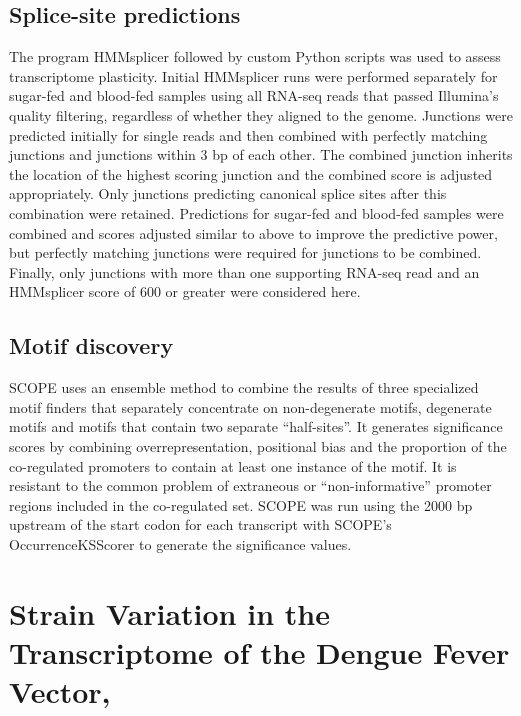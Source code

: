 \subsection{Splice-site predictions}

The program HMMsplicer \cite{Dimon2010} followed by custom Python scripts was used to assess transcriptome plasticity. Initial HMMsplicer runs were performed separately for sugar-fed and blood-fed samples using all RNA-seq reads that passed Illumina's quality filtering, regardless of whether they aligned to the genome. Junctions were predicted initially for single reads and then combined with perfectly matching junctions and junctions within 3 bp of each other. The combined junction inherits the location of the highest scoring junction and the combined score is adjusted appropriately. Only junctions predicting canonical splice sites after this combination were retained. Predictions for sugar-fed and blood-fed samples were combined and scores adjusted similar to above to improve the predictive power, but perfectly matching junctions were required for junctions to be combined. Finally, only junctions with more than one supporting RNA-seq read and an HMMsplicer score of 600 or greater were considered here.

\subsection{Motif discovery}

SCOPE \cite{Carlson2007} uses an ensemble method to combine the results of three specialized motif finders that separately concentrate on non-degenerate motifs, degenerate motifs and motifs that contain two separate ``half-sites''. It generates significance scores by combining overrepresentation, positional bias and the proportion of the co-regulated promoters to contain at least one instance of the motif. It is resistant to the common problem of extraneous or ``non-informative'' promoter regions included in the co-regulated set. SCOPE was run using the 2000 bp upstream of the start codon for each transcript with SCOPE's OccurrenceKSScorer to generate the significance values.




\section{Strain Variation in the Transcriptome of the Dengue Fever Vector, \Aea}

